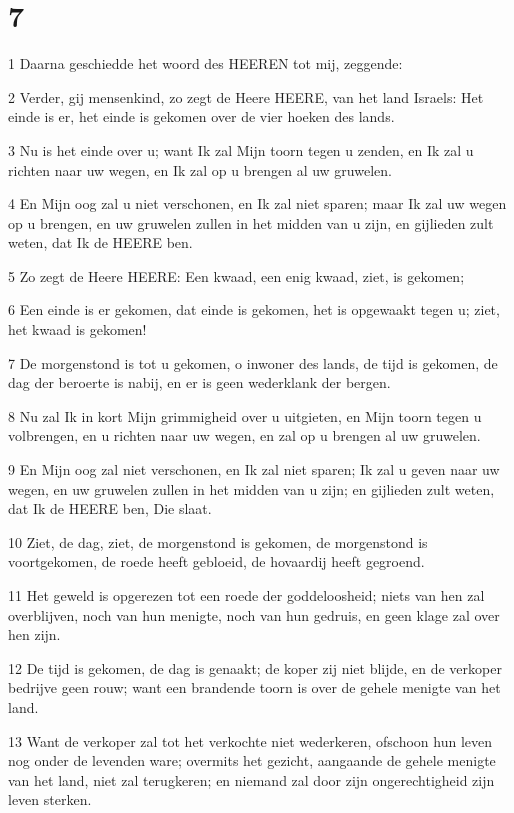 \chapter{7}

\par 1 Daarna geschiedde het woord des HEEREN tot mij, zeggende:
\par 2 Verder, gij mensenkind, zo zegt de Heere HEERE, van het land Israels: Het einde is er, het einde is gekomen over de vier hoeken des lands.
\par 3 Nu is het einde over u; want Ik zal Mijn toorn tegen u zenden, en Ik zal u richten naar uw wegen, en Ik zal op u brengen al uw gruwelen.
\par 4 En Mijn oog zal u niet verschonen, en Ik zal niet sparen; maar Ik zal uw wegen op u brengen, en uw gruwelen zullen in het midden van u zijn, en gijlieden zult weten, dat Ik de HEERE ben.
\par 5 Zo zegt de Heere HEERE: Een kwaad, een enig kwaad, ziet, is gekomen;
\par 6 Een einde is er gekomen, dat einde is gekomen, het is opgewaakt tegen u; ziet, het kwaad is gekomen!
\par 7 De morgenstond is tot u gekomen, o inwoner des lands, de tijd is gekomen, de dag der beroerte is nabij, en er is geen wederklank der bergen.
\par 8 Nu zal Ik in kort Mijn grimmigheid over u uitgieten, en Mijn toorn tegen u volbrengen, en u richten naar uw wegen, en zal op u brengen al uw gruwelen.
\par 9 En Mijn oog zal niet verschonen, en Ik zal niet sparen; Ik zal u geven naar uw wegen, en uw gruwelen zullen in het midden van u zijn; en gijlieden zult weten, dat Ik de HEERE ben, Die slaat.
\par 10 Ziet, de dag, ziet, de morgenstond is gekomen, de morgenstond is voortgekomen, de roede heeft gebloeid, de hovaardij heeft gegroend.
\par 11 Het geweld is opgerezen tot een roede der goddeloosheid; niets van hen zal overblijven, noch van hun menigte, noch van hun gedruis, en geen klage zal over hen zijn.
\par 12 De tijd is gekomen, de dag is genaakt; de koper zij niet blijde, en de verkoper bedrijve geen rouw; want een brandende toorn is over de gehele menigte van het land.
\par 13 Want de verkoper zal tot het verkochte niet wederkeren, ofschoon hun leven nog onder de levenden ware; overmits het gezicht, aangaande de gehele menigte van het land, niet zal terugkeren; en niemand zal door zijn ongerechtigheid zijn leven sterken.
